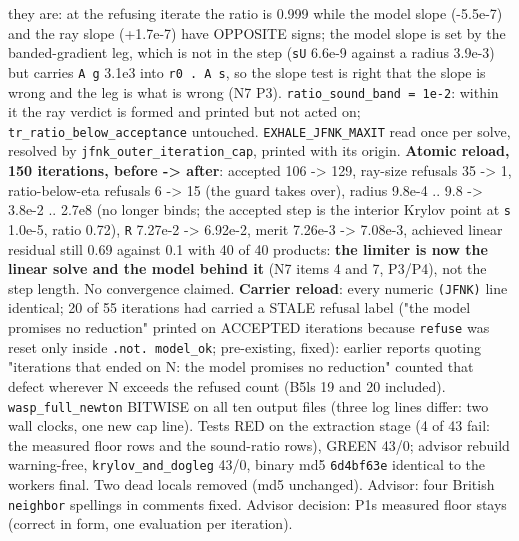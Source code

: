 \documentclass[english,a4paper]{my_memo}
\begin{document}
\begin{itemize}
  they are: at the refusing iterate the ratio is 0.999 while the model slope
  (-5.5e-7) and the ray slope (+1.7e-7) have OPPOSITE signs; the model slope
  is set by the banded-gradient leg, which is not in the step (\texttt{\textbar{}\textbar{}sU\textbar{}\textbar{}}
  6.6e-9 against a radius 3.9e-3) but carries \texttt{\textbar{}\textbar{}A\ g\textbar{}\textbar{}} 3.1e3 into
  \texttt{r0\ .\ A\ s}, so the slope test is right that the slope is wrong and the
  leg is what is wrong (N7 P3). \texttt{ratio\_sound\_band\ =\ 1e-2}: within it the
  ray verdict is formed and printed but not acted on;
  \texttt{tr\_ratio\_below\_acceptance} untouched. \texttt{EXHALE\_JFNK\_MAXIT} read once per
  solve, resolved by \texttt{jfnk\_outer\_iteration\_cap}, printed with its origin.
  \textbf{Atomic reload, 150 iterations, before -\textgreater{} after}: accepted 106 -\textgreater{} 129,
  ray-size refusals 35 -\textgreater{} 1, ratio-below-eta refusals 6 -\textgreater{} 15 (the guard
  takes over), radius 9.8e-4 .. 9.8 -\textgreater{} 3.8e-2 .. 2.7e8 (no longer binds;
  the accepted step is the interior Krylov point at \texttt{\textbar{}\textbar{}s\textbar{}\textbar{}} 1.0e-5, ratio
  0.72), \texttt{\textbar{}\textbar{}R\textbar{}\textbar{}} 7.27e-2 -\textgreater{} 6.92e-2, merit 7.26e-3 -\textgreater{} 7.08e-3, achieved
  linear residual still 0.69 against 0.1 with 40 of 40 products: \textbf{the
  limiter is now the linear solve and the model behind it} (N7 items 4
  and 7, P3/P4), not the step length. No convergence claimed. \textbf{Carrier
  reload}: every numeric \texttt{(JFNK)} line identical; 20 of 55 iterations had
  carried a STALE refusal label ("the model promises no reduction" printed
  on ACCEPTED iterations because \texttt{refuse} was reset only inside \texttt{.not.\ model\_ok}; pre-existing, fixed): earlier reports quoting "iterations that
  ended on N: the model promises no reduction" counted that defect wherever
  N exceeds the refused count (B5l\textquotesingle s 19 and 20 included). \texttt{wasp\_full\_newton}
  BITWISE on all ten output files (three log lines differ: two wall clocks,
  one new cap line). Tests RED on the extraction stage (4 of 43 fail: the
  measured floor rows and the sound-ratio rows), GREEN 43/0; advisor rebuild
  warning-free, \texttt{krylov\_and\_dogleg} 43/0, binary md5 \texttt{6d4bf63e} identical
  to the worker\textquotesingle s final. Two dead locals removed (md5 unchanged). Advisor:
  four British \texttt{neighbor} spellings in comments fixed. Advisor decision:
  P1\textquotesingle s measured floor stays (correct in form, one evaluation per iteration).

\end{itemize}
\end{document}
